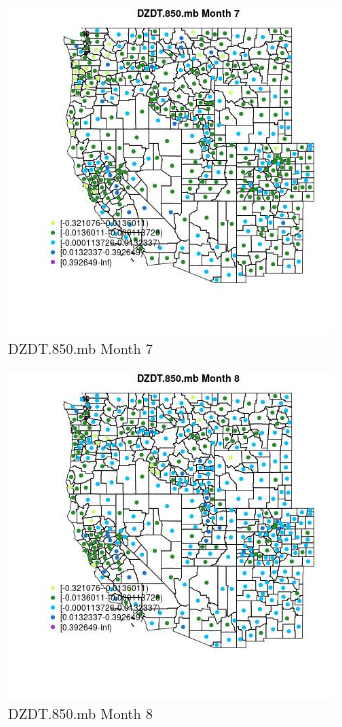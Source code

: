 \begin{figure} 
\centering  
\includegraphics[width=0.77\textwidth]{Code_Outputs/df_report_ML_predictors_CountyCentroid_Locations_Dates_2008-01-01to2018-12-31_MapObsMo7DZDT850mb.jpg} 
\caption{\label{fig:df_report_ML_predictors_CountyCentroid_Locations_Dates_2008-01-01to2018-12-31MapObsMo7DZDT850mb}DZDT.850.mb Month 7} 
\end{figure} 
 

\begin{figure} 
\centering  
\includegraphics[width=0.77\textwidth]{Code_Outputs/df_report_ML_predictors_CountyCentroid_Locations_Dates_2008-01-01to2018-12-31_MapObsMo8DZDT850mb.jpg} 
\caption{\label{fig:df_report_ML_predictors_CountyCentroid_Locations_Dates_2008-01-01to2018-12-31MapObsMo8DZDT850mb}DZDT.850.mb Month 8} 
\end{figure} 
 

